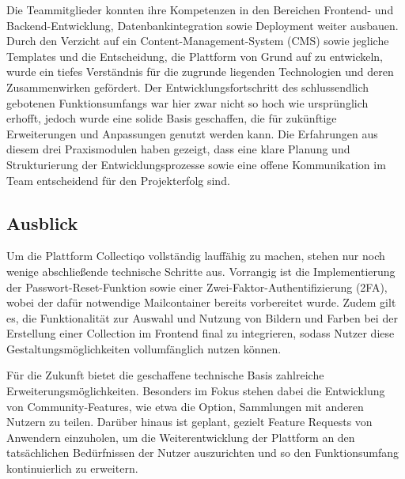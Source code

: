 Die Teammitglieder konnten ihre Kompetenzen in den Bereichen Frontend- und Backend-Entwicklung, Datenbankintegration sowie Deployment weiter ausbauen.
Durch den Verzicht auf ein Content-Management-System (CMS) sowie jegliche Templates und die Entscheidung, die Plattform von Grund auf zu entwickeln, wurde ein tiefes Verständnis für die zugrunde liegenden Technologien und deren Zusammenwirken gefördert.
Der Entwicklungsfortschritt des schlussendlich gebotenen Funktionsumfangs war hier zwar nicht so hoch wie ursprünglich erhofft, jedoch wurde eine solide Basis geschaffen, die für zukünftige Erweiterungen und Anpassungen genutzt werden kann.
Die Erfahrungen aus diesem drei Praxismodulen haben gezeigt, dass eine klare Planung und Strukturierung der Entwicklungsprozesse sowie eine offene Kommunikation im Team entscheidend für den Projekterfolg sind.

\subsection{Ausblick}\label{subsec:ausblick-zukuenftige-ziele-und-funktionen}

Um die Plattform Collectiqo vollständig lauffähig zu machen, stehen nur noch wenige abschließende technische Schritte aus.
Vorrangig ist die Implementierung der Passwort-Reset-Funktion sowie einer Zwei-Faktor-Authentifizierung (2FA), wobei der dafür notwendige Mailcontainer bereits vorbereitet wurde.
Zudem gilt es, die Funktionalität zur Auswahl und Nutzung von Bildern und Farben bei der Erstellung einer Collection im Frontend final zu integrieren, sodass Nutzer diese Gestaltungsmöglichkeiten vollumfänglich nutzen können.

Für die Zukunft bietet die geschaffene technische Basis zahlreiche Erweiterungsmöglichkeiten.
Besonders im Fokus stehen dabei die Entwicklung von Community-Features, wie etwa die Option, Sammlungen mit anderen Nutzern zu teilen.
Darüber hinaus ist geplant, gezielt Feature Requests von Anwendern einzuholen, um die Weiterentwicklung der Plattform an den tatsächlichen Bedürfnissen der Nutzer auszurichten und so den Funktionsumfang kontinuierlich zu erweitern.



